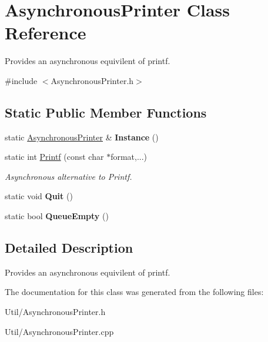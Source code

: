 \hypertarget{class_asynchronous_printer}{
\section{\-Asynchronous\-Printer \-Class \-Reference}
\label{class_asynchronous_printer}
}


\-Provides an asynchronous equivilent of printf.  




{\ttfamily \#include $<$\-Asynchronous\-Printer.\-h$>$}

\subsection*{\-Static \-Public \-Member \-Functions}
\begin{DoxyCompactItemize}
\item 
\hypertarget{class_asynchronous_printer_ab1553ae0b41d933f38a8e8439f687b42}{
static \hyperlink{class_asynchronous_printer}{\-Asynchronous\-Printer} \& {\bfseries \-Instance} ()}
\label{class_asynchronous_printer_ab1553ae0b41d933f38a8e8439f687b42}

\item 
\hypertarget{class_asynchronous_printer_a0ef1c5904f24fd48fda1e724f4f0f68f}{
static int \hyperlink{class_asynchronous_printer_a0ef1c5904f24fd48fda1e724f4f0f68f}{\-Printf} (const char $\ast$format,...)}
\label{class_asynchronous_printer_a0ef1c5904f24fd48fda1e724f4f0f68f}

\begin{DoxyCompactList}\small\item\em \-Asynchronous alternative to \-Printf. \end{DoxyCompactList}\item 
\hypertarget{class_asynchronous_printer_af42d841d7d5c70f34e81c98a212478b6}{
static void {\bfseries \-Quit} ()}
\label{class_asynchronous_printer_af42d841d7d5c70f34e81c98a212478b6}

\item 
\hypertarget{class_asynchronous_printer_af56a3f2c43c68f55495fc7ffd1025c1e}{
static bool {\bfseries \-Queue\-Empty} ()}
\label{class_asynchronous_printer_af56a3f2c43c68f55495fc7ffd1025c1e}

\end{DoxyCompactItemize}


\subsection{\-Detailed \-Description}
\-Provides an asynchronous equivilent of printf. 

\-The documentation for this class was generated from the following files\-:\begin{DoxyCompactItemize}
\item 
\-Util/\-Asynchronous\-Printer.\-h\item 
\-Util/\-Asynchronous\-Printer.\-cpp\end{DoxyCompactItemize}
